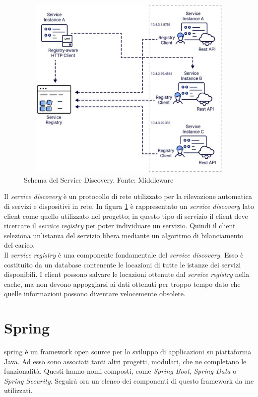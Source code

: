 \begin{figure}[H]
    \centering
    \includegraphics[width=12cm, height=9cm]{images/service-discovery.pdf}
    \caption{Schema del Service Discovery. Fonte: Middleware}
    \label{fig:servdisc}
\end{figure}

Il \textit{service discovery} è un protocollo di rete utilizzato per la rilevazione automatica di servizi e dispositivi in rete. In figura \ref{fig:servdisc} è rappresentato un \textit{service discovery} lato client come quello utilizzato nel progetto; in questo tipo di servizio il client deve ricercare il \textit{service registry} per poter individuare un servizio. Quindi il client seleziona un'istanza del servizio libera mediante un algoritmo di bilanciamento del carico.\\
Il \textit{service registry} è una componente fondamentale del \textit{service discovery}. Esso è costituito da un database contenente le locazioni di tutte le istanze dei servizi disponibili. I client possono salvare le locazioni ottenute dal \textit{service registry} nella cache, ma non devono appoggiarsi ai dati ottenuti per troppo tempo dato che quelle informazioni possono diventare velocemente obsolete.

\section{Spring}\label{spring}
\Gls{spring} è un framework open source per lo sviluppo di applicazioni su piattaforma Java. Ad esso sono associati tanti altri progetti, modulari, che ne completano le funzionalità. Questi hanno nomi composti, come \textit{Spring Boot}, \textit{Spring Data} o \textit{Spring Security}. Seguirà ora un elenco dei componenti di questo framework da me utilizzati.

